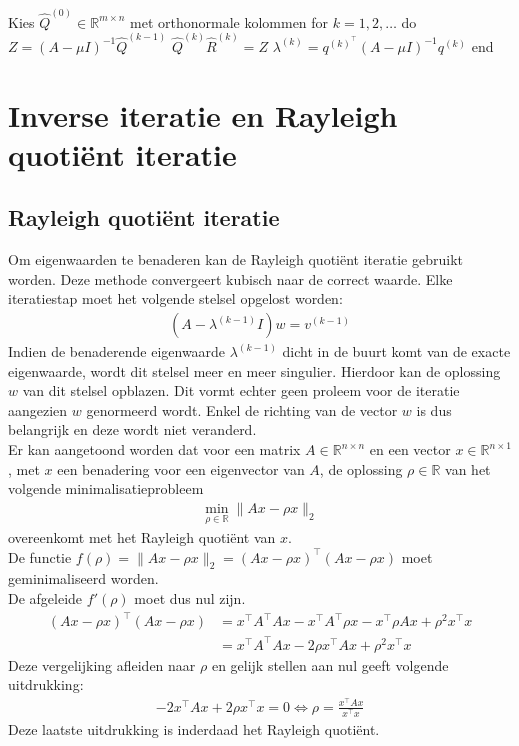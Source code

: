 \documentclass[a4paper, 12pt, titlepage, fleqn]{article}
\begin{document}
\begin{algorithm}[caption={Gelijktijdige iteratie}, label={alg:gelijktijdige iteratie}]
Kies $\hat{Q}^{(0)} \in \mathbb{R}^{m\times n}$ met orthonormale kolommen
for $k = 1,2,\ldots$ do
	$Z = (A-\mu I)^{-1}\hat{Q}^{(k-1)}$
	$\hat{Q}^{(k)}\hat{R}^{(k)} = Z$
	$\lambda^{(k)} = q^{(k)^\intercal}(A -\mu I)^{-1}q^{(k)}$
end

\end{algorithm}

\section{Inverse iteratie en Rayleigh quoti\"ent iteratie}
\subsection{Rayleigh quoti\"ent iteratie}
Om eigenwaarden te benaderen kan de Rayleigh quoti\"ent iteratie gebruikt worden. Deze methode convergeert kubisch naar de correct waarde. Elke iteratiestap moet het volgende stelsel opgelost worden:
\begin{align*}
(A - \lambda^{(k-1)}I)w = v^{(k-1)}
\end{align*}
Indien de benaderende eigenwaarde $\lambda^{(k-1)}$ dicht in de buurt komt van de exacte eigenwaarde, wordt dit stelsel meer en meer singulier. Hierdoor kan de oplossing $w$ van dit stelsel opblazen. Dit vormt echter geen proleem voor de iteratie aangezien $w$ genormeerd wordt. Enkel de richting van de vector $w$ is dus belangrijk en deze wordt niet veranderd.\\

Er kan aangetoond worden dat voor een matrix $A \in \mathbb{R}^{n\times n}$ en een vector $x \in \mathbb{R}^{n \times 1}$, met $x$ een benadering voor een eigenvector van $A$, de oplossing $\rho \in \mathbb{R}$ van het volgende minimalisatieprobleem
\begin{align*}
\min_{\rho \in \mathbb{R}} \| Ax - \rho x\|_2
\end{align*}
overeenkomt met het Rayleigh quoti\"ent van $x$. \\

De functie $f(\rho) = \|Ax-\rho x\|_2 = (Ax-\rho x)^\intercal(Ax-\rho x)$ moet geminimaliseerd worden.\\ De afgeleide $f'(\rho)$ moet dus nul zijn.
\begin{align*}
(Ax-\rho x)^\intercal (Ax-\rho x) &= x^\intercal A^\intercal Ax - x^\intercal A^\intercal\rho x - x^\intercal\rho Ax + \rho^2x^\intercal x\\
&= x^\intercal A^\intercal Ax -2\rho x^\intercal Ax + \rho^2x^\intercal x
\end{align*}
Deze vergelijking afleiden naar $\rho$ en gelijk stellen aan nul geeft volgende uitdrukking:
\begin{align*}
-2x^\intercal Ax + 2\rho x^\intercal x = 0 \Leftrightarrow \rho = \frac{x^\intercal Ax}{x^\intercal x}
\end{align*}
Deze laatste uitdrukking is inderdaad het Rayleigh quoti\"ent.
\end{document}
